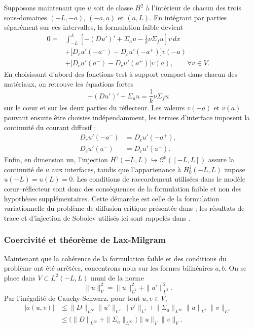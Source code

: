 \documentclass{article}
\begin{document}
Supposons maintenant que $u$ soit de classe $H^2$ à l'intérieur de chacun des trois sous-domaines $(-L,-a)$, $(-a,a)$ et $(a,L)$. En intégrant par parties séparément sur ces intervalles, la formulation faible devient
\begin{align*}
0={}&\int_{-L}^{L}\left[-(Du')'+\Sigma_a u-\frac1k\nu\Sigma_f u\right]v\,dx \\
&+\bigl[D_ru'(-a^-)-D_cu'(-a^+)\bigr]v(-a)\\
&+\bigl[D_cu'(a^-)-D_ru'(a^+)\bigr]v(a),
\qquad \forall v\in V.
\end{align*}
En choisissant d'abord des fonctions test à support compact dans chacun des matériaux, on retrouve les équations fortes
\[
-(Du')'+\Sigma_a u=\frac1k\nu\Sigma_f u
\]
sur le cœur et sur les deux parties du réflecteur. Les valeurs $v(-a)$ et $v(a)$ pouvant ensuite être choisies indépendamment, les termes d'interface imposent la continuité du courant diffusif :
\begin{align}
D_ru'(-a^-)&=D_cu'(-a^+),\\
D_cu'(a^-)&=D_ru'(a^+).
\end{align}
Enfin, en dimension un, l'injection $H^1(-L,L)\hookrightarrow\mathcal C^0([-L,L])$ assure la continuité de $u$ aux interfaces, tandis que l'appartenance à $H_0^1(-L,L)$ impose $u(-L)=u(L)=0$. Les conditions de raccordement utilisées dans le modèle cœur--réflecteur sont donc des conséquences de la formulation faible et non des hypothèses supplémentaires. Cette démarche est celle de la formulation variationnelle du problème de diffusion critique présentée dans \cite[chap.~6, section~6.5.1]{Allaire2018}; les résultats de trace et d'injection de Sobolev utilisés ici sont rappelés dans \textcite{Brezis2011}.


\subsubsection{Coercivité et théorème de Lax-Milgram}
\label{sec:Lax-Milgram}
Maintenant que la cohérence de la formulation faible et des conditions du problème ont été arrêtées, concentrons nous sur les formes bilinéaires $a,b$.
On se place dans $V\subset L^2(-L,L)$ muni de la norme 
\[ \|u\|_V^2=\|u\|_{L^2}^2+\|u'\|_{L^2}^2. \]
Par l'inégalité de Cauchy-Schwarz, pour tout $u,v\in V$,
\begin{align*} 
    |a(u,v)| &\le \|D\|_{L^\infty}\|u'\|_{L^2}\|v'\|_{L^2} +\|\Sigma_a\|_{L^\infty}\|u\|_{L^2}\|v\|_{L^2}\\ 
    &\le \bigl(\|D\|_{L^\infty} +\|\Sigma_a\|_{L^\infty}\bigr) \|u\|_V\|v\|_V. 
\end{align*}
\end{document}
